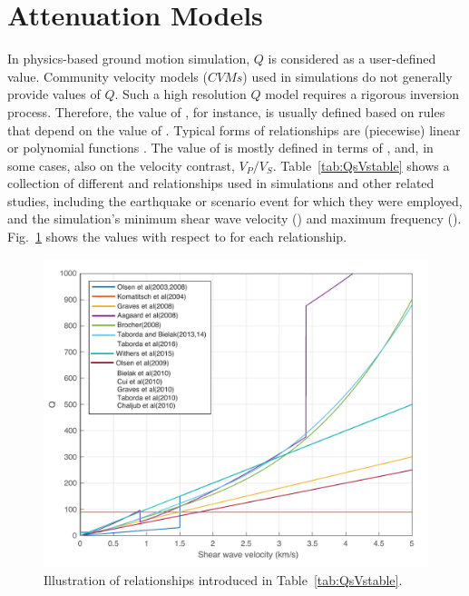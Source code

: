 \section{Attenuation Models}

In physics-based ground motion simulation, $Q$ is considered as a user-defined value. Community velocity models ($CVMs$) used in simulations do not generally provide values of $Q$. Such a high resolution $Q$ model requires a rigorous inversion process. Therefore, the value of \qs{}, for instance, is usually defined based on rules that depend on the value of \vs{}. Typical forms of \qsvs{} relationships are (piecewise) linear or polynomial functions \citep[e.g.,][]{Brocher_2008_BSSA, Brocher_2005_Tech,Olsen_2003_BSSA, Graves_2008_BSSA,Taborda_2013_BSSA}. The value of \qp{} is mostly defined in terms of \qs{}, and, in some cases, also on the velocity contrast, $V_{P}/V_{S}$. Table~\ref{tab:QsVstable} shows a collection of different \qsvs{} and \qpqs{} relationships used in simulations and other related studies, including the earthquake or scenario event for which they were employed, and the simulation's minimum shear wave velocity (\vsmin{}) and maximum frequency (\fmax{}). Fig.~\ref{fig:Figure_q_models}  shows the \qs{} values with respect to \vs{} for each \qsvs{} relationship.  



 \begin{figure}
    \centering
    \includegraphics[width=400 px]{figures/pdf/Figure_01.pdf}
    \caption{Illustration of \qsvs{} relationships introduced in Table~\ref{tab:QsVstable}.}
    \label{fig:Figure_q_models}
\end{figure}

